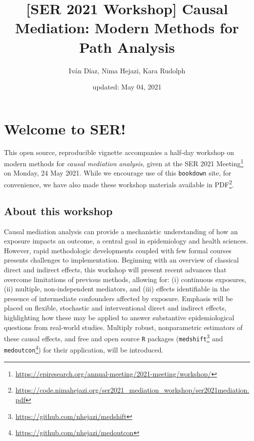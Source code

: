 \documentclass[
  12pt,
]{book}
\title{{[}SER 2021 Workshop{]} Causal Mediation: Modern Methods for Path Analysis}
\author{Iván Díaz, Nima Hejazi, Kara Rudolph}
\date{updated: May 04, 2021}
\newcommand{\passthrough}[1]{#1}
\renewcommand{\href}[2]{#2\footnote{\url{#1}}}
\theoremstyle{definition}
\theoremstyle{definition}
\theoremstyle{definition}
\newcommand{\1}{\mathbbm{1}}
\begin{document}
\maketitle


\thispagestyle{empty}

\begin{center}
\end{center}

\setlength{\abovedisplayskip}{-5pt}
\setlength{\abovedisplayshortskip}{-5pt}

\mainmatter

{
\hypersetup{linkcolor=}
\setcounter{tocdepth}{2}
\tableofcontents
}
\hypertarget{welcome-to-ser}{%
\chapter*{Welcome to SER!}\label{welcome-to-ser}}


This open source, reproducible vignette accompanies a half-day workshop on
modern methods for \emph{causal mediation analysis}, given at the \href{https://epiresearch.org/annual-meeting/2021-meeting/workshop/}{SER 2021
Meeting} on
Monday, 24 May 2021. While we encourage use of this \passthrough{\lstinline!bookdown!} site, for
convenience, we have also made these workshop materials \href{https://code.nimahejazi.org/ser2021_mediation_workshop/ser2021mediation.pdf}{available in
PDF}.

\hypertarget{about}{%
\section{About this workshop}\label{about}}

Causal mediation analysis can provide a mechanistic understanding of how an
exposure impacts an outcome, a central goal in epidemiology and health sciences.
However, rapid methodologic developments coupled with few formal courses
presents challenges to implementation. Beginning with an overview of classical
direct and indirect effects, this workshop will present recent advances that
overcome limitations of previous methods, allowing for: (i) continuous
exposures, (ii) multiple, non-independent mediators, and (iii) effects
identifiable in the presence of intermediate confounders affected by exposure.
Emphasis will be placed on flexible, stochastic and interventional direct and
indirect effects, highlighting how these may be applied to answer substantive
epidemiological questions from real-world studies. Multiply robust,
nonparametric estimators of these causal effects, and free and open source \passthrough{\lstinline!R!}
packages (\href{https://github.com/nhejazi/medshift}{\passthrough{\lstinline!medshift!}} and
\href{https://github.com/nhejazi/medoutcon}{\passthrough{\lstinline!medoutcon!}}) for their application, will
be introduced.
\end{document}
